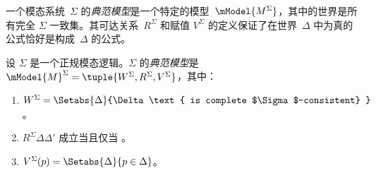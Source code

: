 \documentclass[../../../include/open-logic-section]{subfiles}
\begin{document}


一个模态系统~$\Sigma$ 的\emph{典范模型}是一个特定的模型~$\mModel{M^\Sigma}$，其中的世界是所有完全 $\Sigma$ 一致集。其可达关系~$R^\Sigma$ 和赋值 $V^\Sigma$ 的定义保证了在世界~$\Delta$ 中为真的公式恰好是构成~$\Delta$ 的公式。

\begin{defn}
  设 $\Sigma$ 是一个正规模态逻辑。$\Sigma$ 的\emph{典范模型}是 $\mModel{M}^\Sigma = \tuple{W^\Sigma, R^\Sigma,
    V^\Sigma}$，其中：
  \begin{enumerate}
  \item $W^\Sigma = \Setabs{ \Delta }{\Delta \text{
      is complete $\Sigma$-consistent} }$。
  \item $R^\Sigma \Delta\Delta'$ 成立当且仅当
    。
  \item $V^\Sigma(p) = \Setabs{\Delta}{p \in \Delta}$。
  \end{enumerate}
\end{defn}
\end{document}
